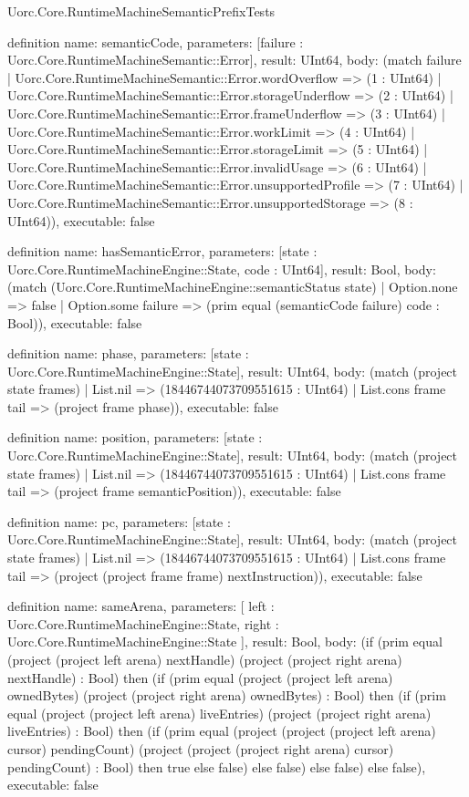 \begin{lexlean}{Uorc.Core.RuntimeMachineSemanticPrefixTests}
\begin{semanticmodule}
definition{
  name: semanticCode,
  parameters: [failure : Uorc.Core.RuntimeMachineSemantic::Error],
  result: UInt64,
  body: (match failure
    | Uorc.Core.RuntimeMachineSemantic::Error.wordOverflow => (1 : UInt64)
    | Uorc.Core.RuntimeMachineSemantic::Error.storageUnderflow => (2 : UInt64)
    | Uorc.Core.RuntimeMachineSemantic::Error.frameUnderflow => (3 : UInt64)
    | Uorc.Core.RuntimeMachineSemantic::Error.workLimit => (4 : UInt64)
    | Uorc.Core.RuntimeMachineSemantic::Error.storageLimit => (5 : UInt64)
    | Uorc.Core.RuntimeMachineSemantic::Error.invalidUsage => (6 : UInt64)
    | Uorc.Core.RuntimeMachineSemantic::Error.unsupportedProfile => (7 : UInt64)
    | Uorc.Core.RuntimeMachineSemantic::Error.unsupportedStorage => (8 : UInt64)),
  executable: false
}

definition{
  name: hasSemanticError,
  parameters: [state : Uorc.Core.RuntimeMachineEngine::State, code : UInt64],
  result: Bool,
  body: (match (Uorc.Core.RuntimeMachineEngine::semanticStatus state)
    | Option.none => false
    | Option.some failure => (prim equal (semanticCode failure) code : Bool)),
  executable: false
}

definition{
  name: phase,
  parameters: [state : Uorc.Core.RuntimeMachineEngine::State],
  result: UInt64,
  body: (match (project state frames)
    | List.nil => (18446744073709551615 : UInt64)
    | List.cons frame tail => (project frame phase)),
  executable: false
}

definition{
  name: position,
  parameters: [state : Uorc.Core.RuntimeMachineEngine::State],
  result: UInt64,
  body: (match (project state frames)
    | List.nil => (18446744073709551615 : UInt64)
    | List.cons frame tail => (project frame semanticPosition)),
  executable: false
}

definition{
  name: pc,
  parameters: [state : Uorc.Core.RuntimeMachineEngine::State],
  result: UInt64,
  body: (match (project state frames)
    | List.nil => (18446744073709551615 : UInt64)
    | List.cons frame tail => (project (project frame frame) nextInstruction)),
  executable: false
}

definition{
  name: sameArena,
  parameters: [
    left : Uorc.Core.RuntimeMachineEngine::State,
    right : Uorc.Core.RuntimeMachineEngine::State
  ],
  result: Bool,
  body: (if (prim equal (project (project left arena) nextHandle) (project (project right arena) nextHandle) : Bool) then (if (prim equal (project (project left arena) ownedBytes) (project (project right arena) ownedBytes) : Bool) then (if (prim equal (project (project left arena) liveEntries) (project (project right arena) liveEntries) : Bool) then (if (prim equal (project (project (project left arena) cursor) pendingCount) (project (project (project right arena) cursor) pendingCount) : Bool) then true else false) else false) else false) else false),
  executable: false
}


\end{semanticmodule}
\end{lexlean}

